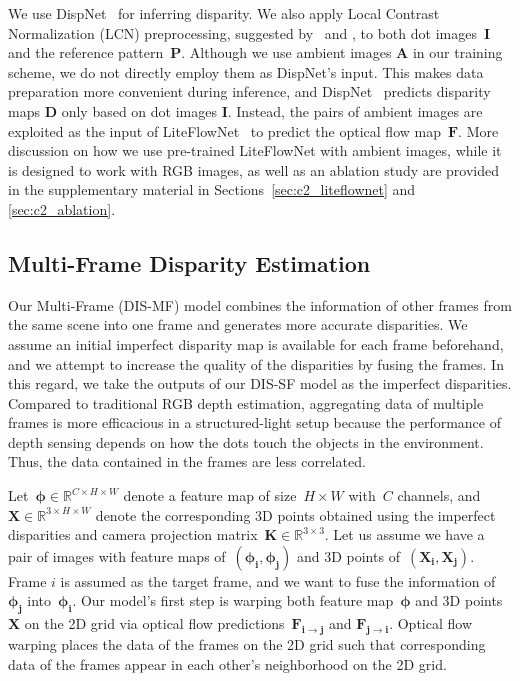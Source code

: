 We use DispNet~\citep{mayer2016large} for inferring disparity. We also apply Local Contrast Normalization (LCN) preprocessing, suggested by~\cite{zhang2018activestereonet} and \cite{riegler2019connecting}, to both dot images~$\boldsymbol{I}$ and the reference pattern~$\boldsymbol{P}$. Although we use ambient images $\boldsymbol{A}$ in our training scheme, we do not directly employ them as DispNet's input. This makes data preparation more convenient during inference, and DispNet~\citep{mayer2016large} predicts disparity maps $\boldsymbol{D}$ only based on dot images $\boldsymbol{I}$. Instead, the pairs of ambient images are exploited as the input of LiteFlowNet~\citep{hui2018liteflownet} to predict the optical flow map~$\boldsymbol{F}$. More discussion on how we use pre-trained LiteFlowNet with ambient images, while it is designed to work with RGB images, as well as an ablation study are provided in the supplementary material in Sections~\ref{sec:c2_liteflownet} and \ref{sec:c2_ablation}.

\subsection{Multi-Frame Disparity Estimation} \label{sec:c2_muti-frame}

Our Multi-Frame (DIS-MF) model combines the information of other frames from the same scene into one frame and generates more accurate disparities. We assume an initial imperfect disparity map is available for each frame beforehand, and we attempt to increase the quality of the disparities by fusing the frames. In this regard, we take the outputs of our DIS-SF model as the imperfect disparities. Compared to traditional RGB depth estimation, aggregating data of multiple frames is more efficacious in a structured-light setup because the performance of depth sensing depends on how the dots touch the objects in the environment. Thus, the data contained in the frames are less correlated.

Let~$\boldsymbol{\phi} \in \mathbb{R}^{C \times H \times W}$ denote a feature map of size~$H \times W$ with~$C$ channels, and~$\boldsymbol{X} \in \mathbb{R}^{3 \times H \times W}$ denote the corresponding 3D points obtained using the imperfect disparities and camera projection matrix~$\boldsymbol{K} \in \mathbb{R}^{3 \times 3}$. Let us assume we have a pair of images with feature maps of~$(\boldsymbol{\phi_i},\boldsymbol{\phi_j})$ and 3D points of~$(\boldsymbol{X_i},\boldsymbol{X_j})$. Frame $i$ is assumed as the target frame, and we want to fuse the information of~$\boldsymbol{\phi_j}$ into~$\boldsymbol{\phi_i}$. Our model's first step is warping both feature map~$\boldsymbol{\phi}$ and 3D points~$\boldsymbol{X}$ on the 2D grid via optical flow predictions~$\boldsymbol{F_{i \rightarrow j}}$ and $\boldsymbol{F_{j \rightarrow i}}$. Optical flow warping places the data of the frames on the 2D grid such that corresponding data of the frames appear in each other's neighborhood on the 2D grid.

